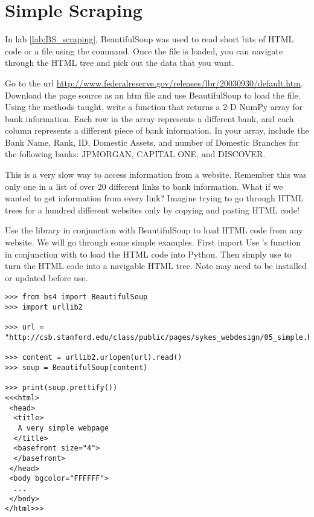 \section*{Simple Scraping}
In lab \ref{lab:BS_scraping}, BeautifulSoup was used to read short bits of HTML code or a file using the  command.
Once the file is loaded, you can navigate through the HTML tree and pick out the data that you want.

\begin{problem}
Go to the url \url{http://www.federalreserve.gov/releases/lbr/20030930/default.htm}.
Download the page source as an htm file and use BeautifulSoup to load the file.
Using the methods taught, write a function that returns a 2-D NumPy array for bank information.
Each row in the array represents a different bank, and each column represents a different piece of bank information.
In your array, include the Bank Name, Rank, ID, Domestic Assets, and number of Domestic Branches for the following banks: JPMORGAN, CAPITAL ONE, and DISCOVER.
\end{problem}

This is a very slow way to access information from a website.
Remember this was only one in a list of over 20 different links to bank information.
What if we wanted to get information from every link?
Imagine trying to go through HTML trees for a hundred different websites only by copying and pasting HTML code!

Use the  library in conjunction with BeautifulSoup to load HTML code from any website.
We will go through some simple examples.
First import 
Use 's  function in conjunction with  to load the HTML code into Python.
Then simply use  to turn the HTML code into a navigable HTML tree. 
Note  may need to be installed or updated before use.

\begin{lstlisting}
>>> from bs4 import BeautifulSoup
>>> import urllib2

>>> url = "http://csb.stanford.edu/class/public/pages/sykes_webdesign/05_simple.html"

>>> content = urllib2.urlopen(url).read()
>>> soup = BeautifulSoup(content)

>>> print(soup.prettify())
<<<html>
 <head>
  <title>
   A very simple webpage
  </title>
  <basefront size="4">
  </basefront>
 </head>
 <body bgcolor="FFFFFF">
  ...
 </body>
</html>>>
\end{lstlisting}

